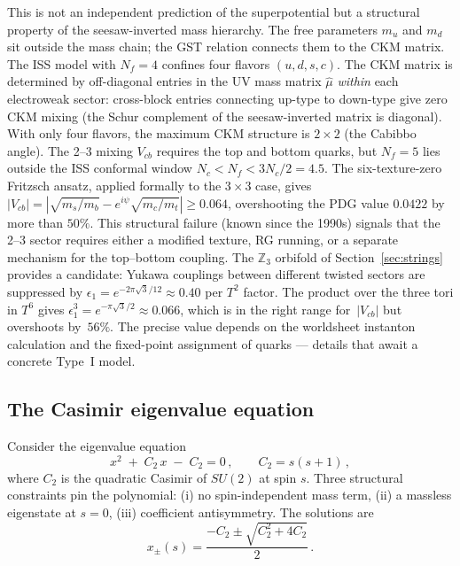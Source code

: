 \documentclass[12pt,a4paper]{article}
\begin{document}
This is not an independent prediction of the superpotential
but a structural property of the seesaw-inverted mass hierarchy.
The free parameters $m_u$ and $m_d$ sit outside the mass chain;
the GST relation connects them to the CKM matrix.
The ISS model with $N_f = 4$ confines four flavors $(u,d,s,c)$.
The CKM matrix is determined by off-diagonal entries in the UV mass
matrix $\hat\mu$ \emph{within} each electroweak sector: cross-block
entries connecting up-type to down-type give zero CKM mixing
(the Schur complement of the seesaw-inverted matrix is diagonal).
With only four flavors, the maximum CKM structure is $2\times 2$
(the Cabibbo angle). The 2--3 mixing $V_{cb}$ requires the
top and bottom quarks, but $N_f = 5$ lies outside the
ISS conformal window $N_c < N_f < 3N_c/2 = 4.5$.
The six-texture-zero Fritzsch ansatz, applied formally to
the $3\times 3$ case, gives
$|V_{cb}| = |\sqrt{m_s/m_b} - e^{i\psi}\sqrt{m_c/m_t}| \geq 0.064$,
overshooting the PDG value $0.0422$ by more than $50\%$.
This structural failure (known since the 1990s)
signals that the 2--3 sector requires either a modified texture,
RG running, or a separate mechanism for the top--bottom coupling.
The $\mathbb{Z}_3$ orbifold of Section~\ref{sec:strings} provides
a candidate: Yukawa couplings between different twisted sectors are
suppressed by $\epsilon_1 = e^{-2\pi\sqrt{3}/12} \approx 0.40$
per $T^2$ factor.  The product over the three tori in $T^6$
gives $\epsilon_1^3 = e^{-\pi\sqrt{3}/2} \approx 0.066$, which is
in the right range for~$|V_{cb}|$ but overshoots by~$56\%$.
The precise value depends on the worldsheet instanton
calculation and the fixed-point assignment of quarks --- details
that await a concrete Type~I model.

\subsection{The Casimir eigenvalue equation}

Consider the eigenvalue equation
\begin{equation}
x^2 \;+\; C_2\,x \;-\; C_2 = 0\,,
\qquad C_2 = s(s+1)\,,
\end{equation}
where $C_2$ is the quadratic Casimir of $SU(2)$ at spin $s$.
Three structural constraints pin the polynomial: (i) no spin-independent
mass term, (ii) a massless eigenstate at $s = 0$,
(iii) coefficient antisymmetry. The solutions are
\begin{equation}
x_{\pm}(s) = \frac{-C_2 \pm \sqrt{C_2^2 + 4C_2}}{2}\,.
\end{equation}
\end{document}

